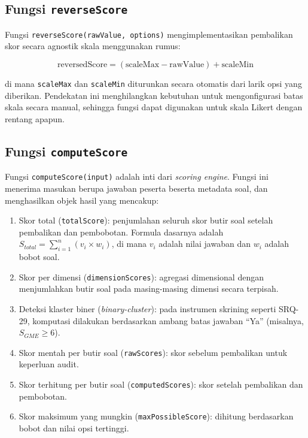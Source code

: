 \subsection{Fungsi \texttt{reverseScore}}

Fungsi \texttt{reverseScore(rawValue, options)} mengimplementasikan pembalikan skor secara agnostik skala menggunakan rumus:

\begin{equation}
  \text{reversedScore} = (\text{scaleMax} - \text{rawValue}) + \text{scaleMin}
\end{equation}

\noindent di mana \texttt{scaleMax} dan \texttt{scaleMin} diturunkan secara otomatis dari larik opsi yang diberikan. Pendekatan ini menghilangkan kebutuhan untuk mengonfigurasi batas skala secara manual, sehingga fungsi dapat digunakan untuk skala Likert dengan rentang apapun.

\subsection{Fungsi \texttt{computeScore}}

Fungsi \texttt{computeScore(input)} adalah inti dari \textit{scoring engine}. Fungsi ini menerima masukan berupa jawaban peserta beserta metadata soal, dan menghasilkan objek hasil yang mencakup:

\begin{enumerate}[leftmargin=2cm]
  \item Skor total (\texttt{totalScore}): penjumlahan seluruh skor butir soal setelah pembalikan dan pembobotan. Formula dasarnya adalah $S_{total} = \sum_{i=1}^{n} (v_i \times w_i)$, di mana $v_i$ adalah nilai jawaban dan $w_i$ adalah bobot soal.
  \item Skor per dimensi (\texttt{dimensionScores}): agregasi dimensional dengan menjumlahkan butir soal pada masing-masing dimensi secara terpisah.
  \item Deteksi klaster biner (\textit{binary-cluster}): pada instrumen skrining seperti SRQ-29, komputasi dilakukan berdasarkan ambang batas jawaban ``Ya'' (misalnya, $S_{GME} \geq 6$).
  \item Skor mentah per butir soal (\texttt{rawScores}): skor sebelum pembalikan untuk keperluan audit.
  \item Skor terhitung per butir soal (\texttt{computedScores}): skor setelah pembalikan dan pembobotan.
  \item Skor maksimum yang mungkin (\texttt{maxPossibleScore}): dihitung berdasarkan bobot dan nilai opsi tertinggi.
\end{enumerate}

